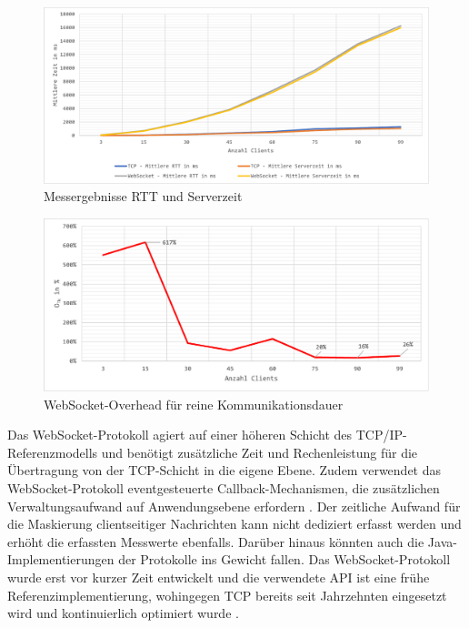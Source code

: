 \documentclass[11pt,a4paper,titlepage]{scrartcl}
\numberwithin{equation}{section}
\begin{document}
\begin{figure}[ht] 
	\begin{center}
		\includegraphics[scale=0.5]{img/benchmark-rttst.pdf}
		\caption{Messergebnisse RTT und Serverzeit}
		\label{fig:evalRttSt}
	\end{center}
\end{figure}
\begin{figure}[ht] 
	\begin{center}
		\includegraphics[scale=0.7]{img/benchmark-tk.pdf}
		\caption{WebSocket-Overhead für reine Kommunikationsdauer}
		\label{fig:evalTk}
	\end{center}
\end{figure} 
\noindent Das WebSocket-Protokoll agiert auf einer höheren Schicht des TCP/IP-Referenzmodells und benötigt zusätzliche Zeit und Rechenleistung für die Übertragung von der TCP-Schicht in die eigene Ebene. Zudem verwendet das WebSocket-Protokoll eventgesteuerte Callback-Mechanismen, die zusätzlichen Verwaltungsaufwand auf Anwendungsebene erfordern \autocite[1007]{skvorc_performance_2014}. Der zeitliche Aufwand für die Maskierung clientseitiger Nachrichten kann nicht dediziert erfasst werden und erhöht die erfassten Messwerte ebenfalls. Darüber hinaus könnten auch die Java-Implementierungen der Protokolle ins Gewicht fallen. Das WebSocket-Protokoll wurde erst vor kurzer Zeit entwickelt und die verwendete API ist eine frühe Referenzimplementierung, wohingegen TCP bereits seit Jahrzehnten eingesetzt wird und kontinuierlich optimiert wurde \autocite[1007]{skvorc_performance_2014}. \\
\end{document}
